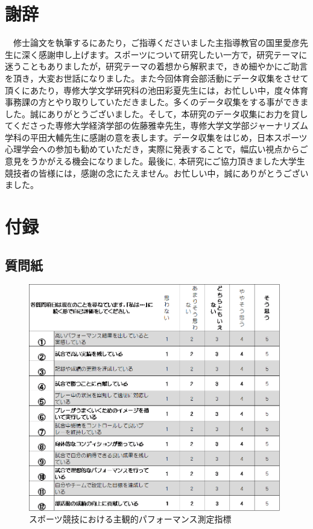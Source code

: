 \documentclass[12pt,a4paper,xelatex,ja=standard]{bxjsarticle}
\begin{document}
\clearpage

\hypertarget{ux8b1dux8f9e}{%
\section{謝辞}\label{ux8b1dux8f9e}}

　修士論文を執筆するにあたり，ご指導くださいました主指導教官の国里愛彦先生に深く感謝申し上げます。スポーツについて研究したい一方で，研究テーマに迷うこともありましたが，研究テーマの着想から解釈まで，きめ細やかにご助言を頂き，大変お世話になりました。また今回体育会部活動にデータ収集をさせて頂くにあたり，専修大学文学研究科の池田彩夏先生には，お忙しい中，度々体育事務課の方とやり取りしていただきました。多くのデータ収集をする事ができました。誠にありがとうございました。そして，本研究のデータ収集にお力を貸してくださった専修大学経済学部の佐藤雅幸先生，専修大学文学部ジャーナリズム学科の平田大輔先生に感謝の意を表します。データ収集をはじめ，日本スポーツ心理学会への参加も勧めていただき，実際に発表することで，幅広い視点からご意見をうかがえる機会になりました。最後に,
本研究にご協力頂きました大学生競技者の皆様には，感謝の念にたえません。お忙しい中，誠にありがとうございました。

\hypertarget{ux4ed8ux9332}{%
\section{付録}\label{ux4ed8ux9332}}

\hypertarget{ux8ceaux554fux7d19}{%
\subsection{質問紙}\label{ux8ceaux554fux7d19}}

\begin{figure}[H]
\centering
\includegraphics[clip,width = 11cm]{question/sq.png}
\caption{スポーツ競技における主観的パフォーマンス測定指標}
\end{figure}
\end{document}
